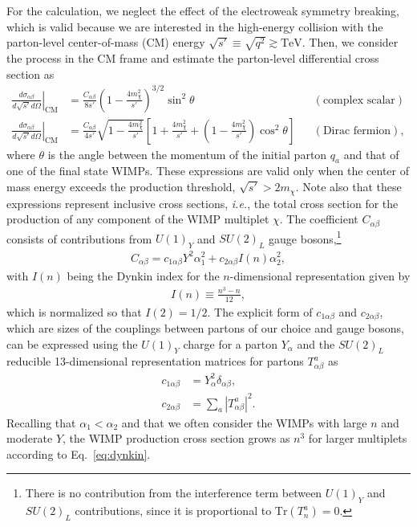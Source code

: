 \documentclass[12pt,twoside,book]{article}
\begin{document}
For the calculation, we neglect the effect of the electroweak symmetry breaking, which is valid because we are interested in the high-energy collision with the parton-level center-of-mass (CM) energy $\sqrt{s'} \equiv \sqrt{q^2} \gtrsim \mathrm{TeV}$.
Then, we consider the process in the CM frame and estimate the parton-level differential cross section as
\begin{align}
  \left. \frac{d \sigma_{\alpha \beta}}{d \sqrt{s'} d \Omega} \right|_{\text{CM}}
  &= \frac{C_{\alpha \beta}}{8 s'} \left( 1 - \frac{4 m_\chi^2}{s'} \right)^{3/2} \sin^2 \theta
  & &(\text{complex scalar}) \label{eq:parton_cross_section_scalar} \\
  \left. \frac{d \sigma_{\alpha \beta}}{d \sqrt{s'} d \Omega} \right|_{\text{CM}}
  &= \frac{C_{\alpha \beta}}{4 s'} \sqrt{1 - \frac{4 m_\chi^2}{s'}}
  \left[ 1 + \frac{4 m_\chi^2}{s'} + \left( 1 - \frac{4 m_\chi^2}{s'} \right) \cos^2 \theta \right]
  & &(\text{Dirac fermion}), \label{eq:parton_cross_section_fermion}
\end{align}
where $\theta$ is the angle between the momentum of the initial parton $q_a$ and that of one of the final state WIMPs.
These expressions are valid only when the center of mass energy exceeds the production threshold, $\sqrt{s'} > 2m_\chi$.
Note also that these expressions represent inclusive cross sections, \textit{i.e.}, the total cross section for the production of any component of the WIMP multiplet $\chi$.
The coefficient $C_{\alpha \beta}$ consists of contributions from $U(1)_Y$ and $SU(2)_L$ gauge bosons,\footnote
{
  There is no contribution from the interference term between $U(1)_Y$ and $SU(2)_L$ contributions, since it is proportional to $\mathrm{Tr} (T^a_n) = 0$.
}
\begin{align}
  C_{\alpha \beta} = c_{1 \alpha \beta} Y^2 \alpha_1^2
  + c_{2 \alpha \beta} I(n) \alpha_2^2,
\end{align}
with $I(n)$ being the Dynkin index for the $n$-dimensional representation given by
\begin{align}
  I(n) \equiv \frac{n^3-n}{12},
  \label{eq:dynkin}
\end{align}
which is normalized so that $I(2) = 1/2$.
The explicit form of $c_{1 \alpha \beta}$ and $c_{2 \alpha \beta}$, which are sizes of the couplings between partons of our choice and gauge bosons, can be expressed using the $U(1)_Y$ charge for a parton $Y_\alpha$ and the $SU(2)_L$ reducible 13-dimensional representation matrices for partons $T^a_{\alpha \beta}$ as
\begin{align}
  c_{1 \alpha \beta} &= Y_\alpha^2 \delta_{\alpha \beta},\\
  c_{2 \alpha \beta} &= \sum_a \left| T^a_{\alpha \beta} \right|^2.
\end{align}
Recalling that $\alpha_1 < \alpha_2$ and that we often consider the WIMPs with large $n$ and moderate $Y$, the WIMP production cross section grows as $n^3$ for larger multiplets according to Eq.~\eqref{eq:dynkin}.
\end{document}
